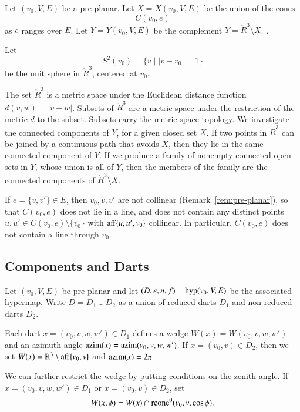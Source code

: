 \begin{definition}\label{def:XY}
Let $(v_0,V,E)$ be a pre-planar.  Let $X=X(v_0,V,E)$ be the union of the
cones
   $$C(v_0,e)$$
as $e$ ranges over $E$.  Let $Y=Y(v_0,V,E)$ be the complement
$Y = \ring{R}^3\setminus X$.
.
\end{definition}


Let $$S^2(v_0) = \{ v \mid | v-v_0 | = 1\}$$ be the unit sphere in
$\ring{R}^3$, centered at $v_0$.  

The set $\ring{R}^3$ is a metric space under the
Euclidean distance function $d(v,w) = |v-w|$.  Subsets of
$\ring{R}^3$ are a metric space under the restriction of the metric
$d$ to the subset. Subsets carry the metric space topology.  We
investigate the connected components of $Y$,
for a given closed set $X$.    If two
points in $\ring{R}^3$ 
can be joined by a continuous path that avoids $X$,
then they lie in the same connected component of $Y$.
If we produce a family of nonempty connected open sets in
$Y$, whose union is all of $Y$, then the
members of the family are the connected components of $\ring{R}^3\setminus
X$.






If $e=\{v,v'\}\in E$, then $v_0,v,v'$ are not collinear
(Remark~\ref{rem:pre-planar}), so that $C(v_0,e)$
does not lie in a line, and does not contain any
distinct points $u,u'\in
C(v_0,e)\setminus\{v_0\}$ 
with ${\operatorname{aff}}\{u,u',v_0\}$ collinear. 
In particular, $C(v_0,e)$ does not contain a line through $v_0$.



\subsection{Components and Darts}

Let $(v_0,V,E)$ be pre-planar and let $(D,e,n,f) = {\operatorname{hyp}}(v_0,V,E)$
be the associated hypermap.  Write $D = D_1\cup D_2$ as a union of
reduced darts $D_1$ and non-reduced darts $D_2$.

Each dart $x=(v_0,v,w,w')\in D_1$ defines
a wedge $W(x) = W(v_0,v,w,w')$ and an azimuth angle ${\operatorname{azim}}(x) =
{\operatorname{azim}}(v_0,v,w,w')$.   If $x=(v_0,v)\in D_2$, then we set
$W(x) = \mathbb{R}^3\setminus {\operatorname{aff}}\{v_0,v\}$ and ${\operatorname{azim}}(x) = 2\pi$.

We can further restrict the wedge by putting conditions on the zenith angle.
If $x = (v_0,v,w,w')\in D_1$ or $x = (v_0,v)\in D_2$, set
    $$
    W(x,\phi) = W(x) \cap {\operatorname{rcone}}^0(v_0,v,\cos\phi).
    $$

